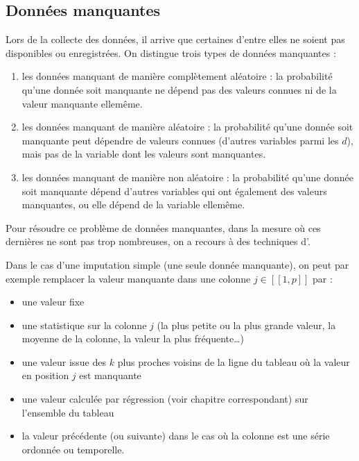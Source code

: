 \documentclass[letterpaper,10pt,english]{jupyterBook}
\begin{document}
\subsection{Données manquantes}
\label{\detokenize{statsdescriptives:donnees-manquantes}}
\sphinxAtStartPar
Lors de la collecte des données, il arrive que certaines d’entre elles ne soient pas disponibles ou enregistrées. On distingue trois types de données manquantes :
\begin{enumerate}
%
\item {} 
\sphinxAtStartPar
les données manquant de manière complètement aléatoire :  la probabilité qu’une donnée soit manquante ne dépend pas des valeurs connues ni de la valeur manquante elle\sphinxhyphen{}même.

\item {} 
\sphinxAtStartPar
les données manquant de manière aléatoire :  la probabilité qu’une donnée soit manquante peut dépendre de valeurs connues (d’autres variables parmi les \(d\)), mais pas de la variable dont les valeurs sont manquantes.

\item {} 
\sphinxAtStartPar
les données manquant de manière non aléatoire : la probabilité qu’une donnée soit manquante dépend d’autres variables qui ont également des valeurs manquantes, ou elle dépend de la variable elle\sphinxhyphen{}même.

\end{enumerate}

\sphinxAtStartPar
Pour résoudre ce problème de données manquantes, dans la mesure où ces dernières ne sont pas trop nombreuses, on a recours à des techniques d’.

\sphinxAtStartPar
Dans le cas d’une imputation simple (une seule donnée manquante), on peut par exemple remplacer la valeur manquante dans une colonne \(j\in[\![1,p]\!]\) par :
\begin{itemize}
\item {} 
\sphinxAtStartPar
une valeur fixe

\item {} 
\sphinxAtStartPar
une statistique sur la colonne \(j\) (la plus petite ou la plus grande valeur, la moyenne de la colonne, la valeur la plus fréquente…)

\item {} 
\sphinxAtStartPar
une valeur issue des \(k\) plus proches voisins de la ligne du tableau où la valeur en position \(j\) est manquante

\item {} 
\sphinxAtStartPar
une valeur calculée par régression (voir chapitre correspondant) sur l’ensemble du tableau

\item {} 
\sphinxAtStartPar
la valeur précédente (ou suivante) dans le cas où la colonne est une série ordonnée ou temporelle.

\end{itemize}
\end{document}
